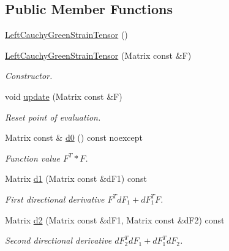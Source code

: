 \subsection*{\-Public \-Member \-Functions}
\begin{DoxyCompactItemize}
\item 
\hyperlink{classFunG_1_1LinearAlgebra_1_1LeftCauchyGreenStrainTensor_af71c16a98707cf3cc1756d319cddbeed}{\-Left\-Cauchy\-Green\-Strain\-Tensor} ()
\item 
\hyperlink{classFunG_1_1LinearAlgebra_1_1LeftCauchyGreenStrainTensor_a6bfc0f686be29024dc740630f364d051}{\-Left\-Cauchy\-Green\-Strain\-Tensor} (\-Matrix const \&\-F)
\begin{DoxyCompactList}\small\item\em \-Constructor. \end{DoxyCompactList}\item 
void \hyperlink{classFunG_1_1LinearAlgebra_1_1LeftCauchyGreenStrainTensor_a3ab24c88bf4e9f9240dee4544027c238}{update} (\-Matrix const \&\-F)
\begin{DoxyCompactList}\small\item\em \-Reset point of evaluation. \end{DoxyCompactList}\item 
\-Matrix const \& \hyperlink{classFunG_1_1LinearAlgebra_1_1LeftCauchyGreenStrainTensor_a541f165ca20f61eeae1b5cf2d6bc42c6}{d0} () const noexcept
\begin{DoxyCompactList}\small\item\em \-Function value $ F^T * F $. \end{DoxyCompactList}\item 
\-Matrix \hyperlink{classFunG_1_1LinearAlgebra_1_1LeftCauchyGreenStrainTensor_a34d6775717ec6b93532d601142a1affc}{d1} (\-Matrix const \&d\-F1) const 
\begin{DoxyCompactList}\small\item\em \-First directional derivative $ F^T dF_1 + dF_1^T F $. \end{DoxyCompactList}\item 
\-Matrix \hyperlink{classFunG_1_1LinearAlgebra_1_1LeftCauchyGreenStrainTensor_ab94232f92cff38c90fd3fbfb28d0fee7}{d2} (\-Matrix const \&d\-F1, \-Matrix const \&d\-F2) const 
\begin{DoxyCompactList}\small\item\em \-Second directional derivative $ dF_2^T dF_1 + dF_1^T dF_2 $. \end{DoxyCompactList}\end{DoxyCompactItemize}


